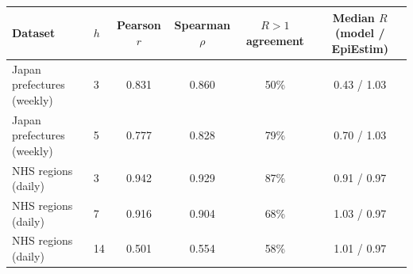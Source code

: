\begin{tabular}{llcccc}
\hline
Dataset & $h$ & Pearson $r$ & Spearman $\rho$ & $R{>}1$ agreement & Median $R$ (model / EpiEstim) \\
\hline
Japan prefectures (weekly) & 3 & 0.831 & 0.860 & 50\% & 0.43 / 1.03 \\
Japan prefectures (weekly) & 5 & 0.777 & 0.828 & 79\% & 0.70 / 1.03 \\
NHS regions (daily) & 3 & 0.942 & 0.929 & 87\% & 0.91 / 0.97 \\
NHS regions (daily) & 7 & 0.916 & 0.904 & 68\% & 1.03 / 0.97 \\
NHS regions (daily) & 14 & 0.501 & 0.554 & 58\% & 1.01 / 0.97 \\
\hline
\end{tabular}
